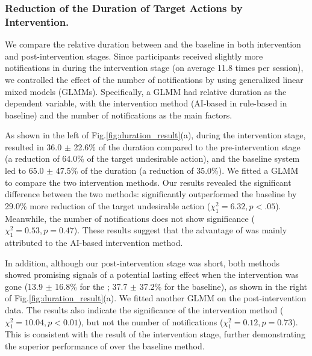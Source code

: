 

\subsubsection{Reduction of the Duration of Target Actions by Intervention.}
We compare the relative duration between \projectname and the baseline in both intervention and post-intervention stages.
Since participants received slightly more notifications in \projectname during the intervention stage (on average 11.8  times per session), we controlled the effect of the number of notifications by using generalized linear mixed models (GLMMs).
Specifically, a GLMM had relative duration as the dependent variable, with the intervention method (AI-based in \projectname \vs rule-based in baseline) and the number of notifications as the main factors.

As shown in the left of Fig.\ref{fig:duration_result}(a), during the intervention stage, \projectname resulted in 36.0 $\pm$ 22.6\% of the duration compared to the pre-intervention stage (\ie a reduction of 64.0\% of the target undesirable action), and the baseline system led to 65.0 $\pm$ 47.5\% of the duration (\ie a reduction of 35.0\%).
We fitted a GLMM to compare the two intervention methods.
Our results revealed the significant difference between the two methods: \projectname significantly outperformed the baseline by 29.0\% more reduction of the target undesirable action ($\chi^2_1=6.32, p < .05$). Meanwhile, the number of notifications does not show significance ($\chi^2_1=0.53, p = 0.47$). These results suggest that the advantage of \projectname was mainly attributed to the AI-based intervention method.

In addition, although our post-intervention stage was short, both methods showed promising signals of a potential lasting effect when the intervention was gone (13.9 $\pm$ 16.8\% for the \projectname; 37.7 $\pm$ 37.2\% for the baseline), as shown in the right of Fig.\ref{fig:duration_result}(a).
We fitted another GLMM on the post-intervention data. The results also indicate the significance of the intervention method ($\chi^2_1=10.04, p<0.01$), but not the number of notifications ($\chi^2_1=0.12, p=0.73$).
This is consistent with the result of the intervention stage, further demonstrating the superior performance of \projectname over the baseline method.


